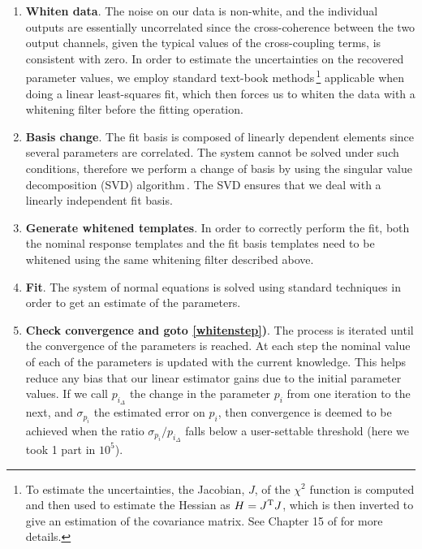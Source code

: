 \begin{enumerate}

\item \textbf{Whiten data}. The noise on our data is non-white, and the individual
 outputs are essentially uncorrelated since the cross-coherence between the two
output channels, given the typical values of the cross-coupling terms, is consistent
with zero. In order to estimate the uncertainties on the recovered parameter
values, we employ standard text-book methods\,\footnote{To estimate the uncertainties,
the Jacobian, $J$, of the $\chi^2$ function is computed and then used to estimate
the Hessian as $H=J^{\rm T}J$, which is then inverted to give an estimation of the covariance
matrix. See Chapter 15 of \cite{numrec} for more details.} applicable when doing
a linear least-squares fit, which then forces us to whiten the data with a whitening
filter before the fitting operation.

\item \textbf{Basis change}\label{step:svd}. The fit basis is composed of linearly dependent elements
since several parameters are correlated. The system cannot
be solved under such conditions, therefore we perform a change of basis by using the singular
value decomposition (SVD) algorithm\,\cite{numrec}. The SVD ensures that we deal with a
linearly independent fit basis.

\item \label{whitenstep}\textbf{Generate whitened templates}. In order to correctly
perform the fit, both the nominal response templates and the fit basis templates need to be whitened
using the same whitening filter described above.

\item \textbf{Fit}. The system of normal equations is solved using standard techniques
in order to get an estimate of the parameters.

\item \textbf{Check convergence and goto \ref{whitenstep})}. The process is iterated
until the convergence of the parameters is reached. At each step the nominal
value of each of the parameters is updated with the current knowledge. This helps reduce
any bias that our linear estimator gains due to the initial parameter values.
If we call $p_{i_\Delta}$ the change in the parameter $p_i$ from one iteration
to the next, and $\sigma_{p_i}$ the estimated error on $p_i$, then convergence is
deemed to be achieved when the ratio ${\sigma_{p_i}}/{p_{i_\Delta}}$ falls
below a user-settable threshold (here we took 1 part in $10^5$).


\end{enumerate}
